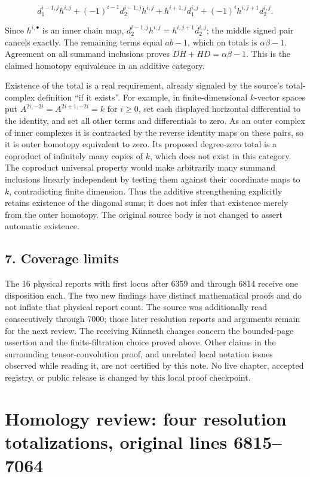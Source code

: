 \documentclass[11pt]{article}
\begin{document}
\[
d_1^{i-1,j}h^{i,j}
+(-1)^{i-1}d_2^{i-1,j}h^{i,j}
+h^{i+1,j}d_1^{i,j}
+(-1)^ih^{i,j+1}d_2^{i,j}.
\]

Since \(h^{i,\bullet}\) is an inner chain map, \(d_2^{i-1,j}h^{i,j}=h^{i,j+1}d_2^{i,j}\); the middle signed pair cancels exactly. The remaining terms equal \(ab-1\), which on totals is \(\alpha\beta-1\). Agreement on all summand inclusions proves \(DH+HD=\alpha\beta-1\). This is the claimed homotopy equivalence in an additive category.

Existence of the total is a real requirement, already signaled by the source's total-complex definition ``if it exists''. For example, in finite-dimensional \(k\)-vector spaces put \(A^{2i,-2i}=A^{2i+1,-2i}=k\) for \(i\geq0\), set each displayed horizontal differential to the identity, and set all other terms and differentials to zero. As an outer complex of inner complexes it is contracted by the reverse identity maps on these pairs, so it is outer homotopy equivalent to zero. Its proposed degree-zero total is a coproduct of infinitely many copies of \(k\), which does not exist in this category. The coproduct universal property would make arbitrarily many summand inclusions linearly independent by testing them against their coordinate maps to \(k\), contradicting finite dimension. Thus the additive strengthening explicitly retains existence of the diagonal sums; it does not infer that existence merely from the outer homotopy. The original source body is not changed to assert automatic existence.

\subsection{7. Coverage limits}\label{note-07-coverage-limits}

The 16 physical reports with first locus after 6359 and through 6814 receive one disposition each. The two new findings have distinct mathematical proofs and do not inflate that physical report count. The source was additionally read consecutively through 7000; those later resolution reports and arguments remain for the next review. The receiving Künneth changes concern the bounded-page assertion and the finite-filtration choice proved above. Other claims in the surrounding tensor-convolution proof, and unrelated local notation issues observed while reading it, are not certified by this note. No live chapter, accepted registry, or public release is changed by this local proof checkpoint.
\clearpage
\section{Homology review: four resolution totalizations, original lines 6815--7064}\label{note-08-homology-review-four-resolution-totalizations-original-lines-68157064}
\end{document}

